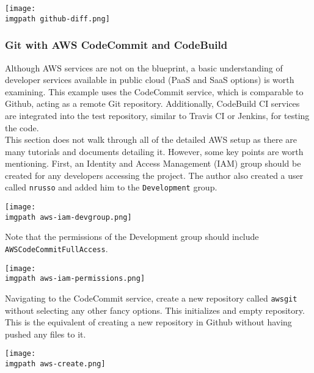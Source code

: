     \begin{minipage}[t]{\linewidth}
	  \centering
      \texttt{[image: \\imgpath github-diff.png]}
    \end{minipage}

\subsubsection{Git with AWS CodeCommit and CodeBuild}
Although AWS services are not on the blueprint, a basic understanding of
developer services available in public cloud (PaaS and SaaS options) is worth
examining. This example uses the CodeCommit service, which is comparable to
Github, acting as a remote Git repository. Additionally, CodeBuild CI services
are integrated into the test repository, similar to Travis CI or Jenkins, for
testing the code. \\

This section does not walk through all of the detailed AWS setup as there are
many tutorials and documents detailing it. However, some key points are worth
mentioning. First, an Identity and Access Management (IAM) group should be
created for any developers accessing the project. The author also created a
user called \verb|nrusso| and added him to the \verb|Development| group. \\

    \begin{minipage}[t]{\linewidth}
	  \centering
      \texttt{[image: \\imgpath aws-iam-devgroup.png]}
    \end{minipage}

Note that the permissions of the Development group should include
\verb|AWSCodeCommitFullAccess|.

    \begin{minipage}[t]{\linewidth}
	  \centering
      \texttt{[image: \\imgpath aws-iam-permissions.png]}
    \end{minipage}

Navigating to the CodeCommit service, create a new repository called
\verb|awsgit| without selecting any other fancy options. This initializes and
empty repository. This is the equivalent of creating a new repository in
Github without having pushed any files to it.

    \begin{minipage}[t]{\linewidth}
	  \centering
      \texttt{[image: \\imgpath aws-create.png]}
    \end{minipage}

